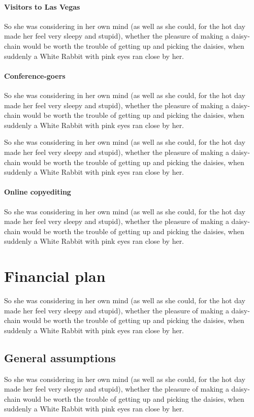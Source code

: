 \documentclass[12pt]{article}
\begin{document}
\paragraph{Visitors to Las Vegas}
\label{sec:orgheadline35}
So she was considering in her own mind (as well as she could, for the hot day made her feel very sleepy and stupid), whether the pleasure of making a daisy-chain would be worth the trouble of getting up and picking the daisies, when suddenly a White Rabbit with pink eyes ran close by her. 

\paragraph{Conference-goers}
\label{sec:orgheadline36}
So she was considering in her own mind (as well as she could, for the hot day made her feel very sleepy and stupid), whether the pleasure of making a daisy-chain would be worth the trouble of getting up and picking the daisies, when suddenly a White Rabbit with pink eyes ran close by her. 

So she was considering in her own mind (as well as she could, for the hot day made her feel very sleepy and stupid), whether the pleasure of making a daisy-chain would be worth the trouble of getting up and picking the daisies, when suddenly a White Rabbit with pink eyes ran close by her. 

\paragraph{Online copyediting}
\label{sec:orgheadline37}
So she was considering in her own mind (as well as she could, for the hot day made her feel very sleepy and stupid), whether the pleasure of making a daisy-chain would be worth the trouble of getting up and picking the daisies, when suddenly a White Rabbit with pink eyes ran close by her. 

\section{Financial plan}
\label{sec:orgheadline45}
So she was considering in her own mind (as well as she could, for the hot day made her feel very sleepy and stupid), whether the pleasure of making a daisy-chain would be worth the trouble of getting up and picking the daisies, when suddenly a White Rabbit with pink eyes ran close by her. 

\subsection{General assumptions}
\label{sec:orgheadline41}
So she was considering in her own mind (as well as she could, for the hot day made her feel very sleepy and stupid), whether the pleasure of making a daisy-chain would be worth the trouble of getting up and picking the daisies, when suddenly a White Rabbit with pink eyes ran close by her. 
\end{document}
